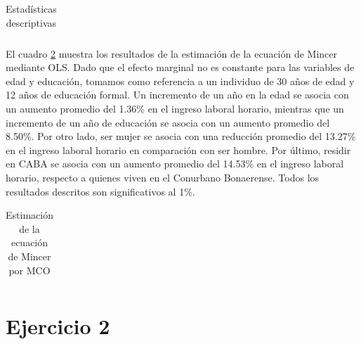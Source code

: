\documentclass[12pt]{article}
\begin{document}
\begin{table}[H]
    \centering
    \caption[Estadísticas descriptivas]{Estadísticas descriptivas}
    \label{tab:sum_stats}
    \begin{adjustbox}{max width=\textwidth}
        \begin{tabular}{l*{2}{c}}
            
        \end{tabular}
    \end{adjustbox}
\end{table}

El cuadro \ref{tab:OLS_mincer} muestra los resultados de la estimación de la ecuación de Mincer mediante OLS. Dado que el efecto marginal no es constante para las variables de edad y educación, tomamos como referencia a un individuo de 30 años de edad y 12 años de educación formal. Un incremento de un año en la edad se asocia con un aumento promedio del 1.36\% en el ingreso laboral horario, mientras que un incremento de un año de educación se asocia con un aumento promedio del 8.50\%. Por otro lado, ser mujer se asocia con una reducción promedio del 13.27\% en el ingreso laboral horario en comparación con ser hombre. Por último, residir en CABA se asocia con un aumento promedio del 14.53\% en el ingreso laboral horario, respecto a quienes viven en el Conurbano Bonaerense. Todos los resultados descritos son significativos al 1\%.
\begin{table}[H]
    \centering
    \caption[Estimación de la ecuación de Mincer por MCO]{Estimación de la ecuación de Mincer por MCO}
    \label{tab:OLS_mincer}
    \begin{adjustbox}{max width=0.6\textwidth}
        \begin{tabular}{l*{2}{c}}
            
        \end{tabular}
    \end{adjustbox}
\end{table}


\section*{Ejercicio 2}
\end{document}

